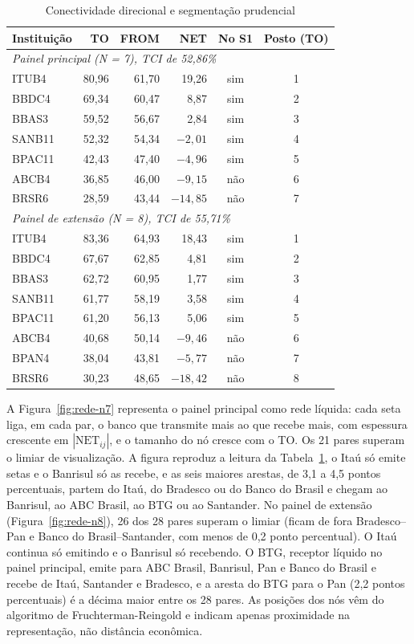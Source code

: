 \begin{table}[!htbp]
\centering
\caption{Conectividade direcional e segmentação prudencial}
\label{tab:dy}
\small
\begin{tabular}{lrrrcc}
\toprule
Instituição & TO & FROM & NET & No S1 & Posto (TO) \\
\midrule
\multicolumn{6}{l}{\textit{Painel principal (N = 7), TCI de 52,86\%}} \\
ITUB4  & 80,96 & 61,70 &    19,26 & sim & 1 \\
BBDC4  & 69,34 & 60,47 &     8,87 & sim & 2 \\
BBAS3  & 59,52 & 56,67 &     2,84 & sim & 3 \\
SANB11 & 52,32 & 54,34 & $-2{,}01$ & sim & 4 \\
BPAC11 & 42,43 & 47,40 & $-4{,}96$ & sim & 5 \\
ABCB4  & 36,85 & 46,00 & $-9{,}15$ & não & 6 \\
BRSR6  & 28,59 & 43,44 & $-14{,}85$ & não & 7 \\
\midrule
\multicolumn{6}{l}{\textit{Painel de extensão (N = 8), TCI de 55,71\%}} \\
ITUB4  & 83,36 & 64,93 &    18,43 & sim & 1 \\
BBDC4  & 67,67 & 62,85 &     4,81 & sim & 2 \\
BBAS3  & 62,72 & 60,95 &     1,77 & sim & 3 \\
SANB11 & 61,77 & 58,19 &     3,58 & sim & 4 \\
BPAC11 & 61,20 & 56,13 &     5,06 & sim & 5 \\
ABCB4  & 40,68 & 50,14 & $-9{,}46$ & não & 6 \\
BPAN4  & 38,04 & 43,81 & $-5{,}77$ & não & 7 \\
BRSR6  & 30,23 & 48,65 & $-18{,}42$ & não & 8 \\
\bottomrule
\end{tabular}
\end{table}

A Figura~\ref{fig:rede-n7} representa o painel principal como rede líquida: cada seta liga, em
cada par, o banco que transmite mais ao que recebe mais, com espessura crescente em
$|\text{NET}_{ij}|$, e o tamanho do nó cresce com o TO. Os 21 pares superam o limiar de
visualização. A figura reproduz a leitura da Tabela~\ref{tab:dy}, o Itaú só emite setas e o
Banrisul só as recebe, e as seis maiores arestas, de 3,1 a 4,5 pontos percentuais, partem do
Itaú, do Bradesco ou do Banco do Brasil e chegam ao Banrisul, ao ABC Brasil, ao BTG ou ao
Santander. No painel de extensão (Figura~\ref{fig:rede-n8}), 26 dos 28 pares superam o limiar
(ficam de fora Bradesco--Pan e Banco do Brasil--Santander, com menos de 0,2 ponto percentual).
O Itaú continua só emitindo e o Banrisul só recebendo. O BTG, receptor líquido no painel
principal, emite para ABC Brasil, Banrisul, Pan e Banco do Brasil e recebe de Itaú, Santander e
Bradesco, e a aresta do BTG para o Pan (2,2 pontos percentuais) é a décima maior entre os 28
pares. As posições dos nós vêm do algoritmo de Fruchterman-Reingold e indicam apenas
proximidade na representação, não distância econômica.
 
